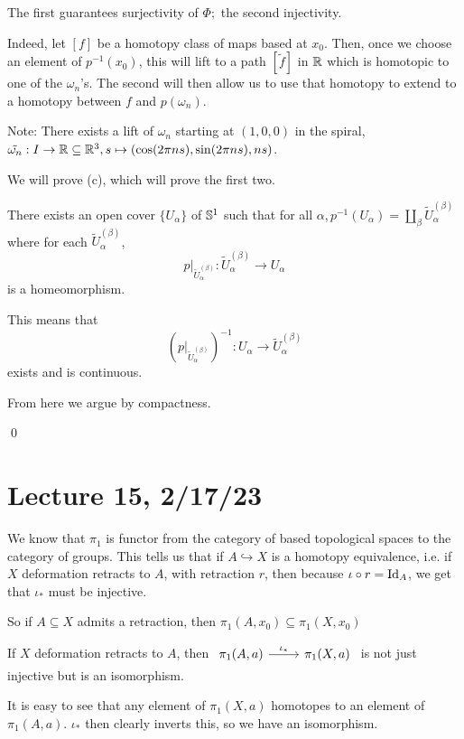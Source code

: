 \documentclass[x11names,reqno,14pt]{extarticle}
\begin{document}
The first guarantees surjectivity of $\Phi;$ the second injectivity. 

Indeed, let $[f]$ be a homotopy class of maps based at $x_0$. Then, once we choose an element of $p^{-1}(x_0)$, this will lift to a path $[\tilde{f}]$ in $\mathbb{R}$ which is homotopic to one of the $\omega_n$'s. The second will then allow us to use that homotopy to extend to a homotopy between $f$ and $p(\omega_n)$.

Note: There exists a lift of $\omega_n$ starting at $(1, 0, 0)$ in the spiral, $\tilde{\omega_n}:I\to\mathbb{R}\subseteq\mathbb{R}^3, s\mapsto (\cos(2\pi n s), \sin(2\pi n s), ns)$. 

We will prove (c), which will prove the first two. 

There exists an open cover $\{U_\alpha\}$ of $\mathbb{S}^1$ such that for all $\alpha, p^{-1}(U_\alpha) = \coprod_{\beta}\tilde{U}_\alpha^{(\beta)}$ where for each $\tilde{U}_\alpha^{(\beta)}$, 
\[
p|_{\tilde{U}_\alpha^{(\beta)}}: \tilde{U}_\alpha^{(\beta)} \to U_\alpha
\]
is a homeomorphism. 

\rem

This means that 
\[
(p|_{\tilde{U}_\alpha^{(\beta)}})^{-1}:U_\alpha\to\tilde{U}_\alpha^{(\beta)}
\]
exists and is continuous. 

From here we argue by compactness. 

\qed

\section*{Lecture 15, 2/17/23}

We know that $\pi_1$ is functor from the category of based topological spaces to the category of groups. This tells us that if $A \hookrightarrow X$ is a homotopy equivalence, i.e. if $X$ deformation retracts to $A$, with retraction $r$, then because $\iota\circ r = \operatorname{\mathrm{Id}}_A$, we get that $\iota_*$ must be injective. 

So if $A \subseteq X$ admits a retraction, then $\pi_1(A, x_0) \subseteq \pi_1(X, x_0)$

\cor

If $X$ deformation retracts to $A$, then $\begin{tikzcd} \pi_1(A, a) \ar[r, "\iota_*"] & \pi_1(X, a)\end{tikzcd}$ is not just injective but is an isomorphism. 

\proof 

It is easy to see that any element of $\pi_1(X, a)$ homotopes to an element of $\pi_1(A, a)$. $\iota_*$ then clearly inverts this, so we have an isomorphism. 
\end{document}
